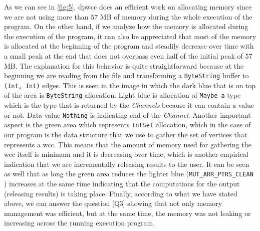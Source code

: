 As we can see in \autoref{fig:5}, \acrshort{dpwcc} does an efficient work on allocating memory since we are not using more than $57$ MB of memory during the whole execution of the program.
On the other hand, if we analyze how the memory is allocated during the execution of the program, it can also be appreciated that most of the memory is allocated at the beginning of the program and steadily decrease over time with a small peak at the end that does not overpass even half of the initial peak of $57$ MB. The explanation for this behavior is quite straightforward because at the beginning we are reading from the file and transforming a \texttt{ByteString} buffer to \texttt{(Int, Int)} edges. This is seen in the image in which the dark blue that is on top of the area is \texttt{ByteString} allocation. Light blue is allocation of \texttt{Maybe a} type which is the type that is returned by the \textit{Channels} because it can contain a value or not. Data value \texttt{Nothing} is indicating end of the \textit{Channel}. 
Another important aspect is the green area which represents \texttt{IntSet} allocation, which in the case of our program is the data structure that we use to gather the set of vertices that represents a \acrshort{wcc}. This means that the amount of memory used for gathering the \acrshort{wcc} itself is minimum and it is decreasing over time, which is another empirical indication that we are incrementally releasing results to the user. It can be seen as well that as long the green area reduces the lighter blue (\texttt{MUT_ARR_PTRS_CLEAN} \cite{ghcheap}) increases at the same time indicating that the computations for the output (releasing results) is taking place. 
Finally, according to what we have stated above, we can answer the question [Q3] showing that not only memory management was efficient, but at the same time, the memory was not leaking or increasing across the running execution program.

